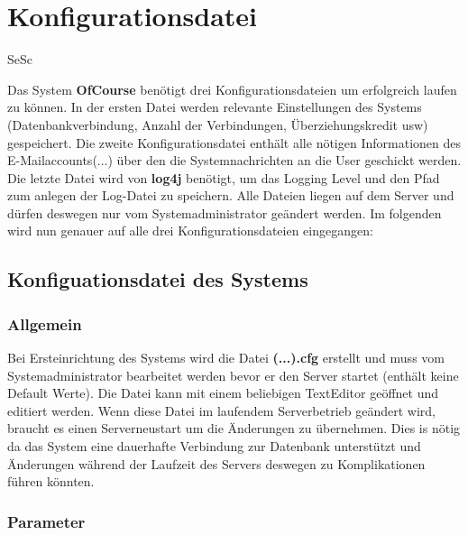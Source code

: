\chapter{Konfigurationsdatei}
\begin{tiny}
	SeSc
\end{tiny}

Das System \textbf{OfCourse} benötigt drei Konfigurationsdateien um erfolgreich laufen zu können. In der ersten Datei werden relevante Einstellungen des Systems (Datenbankverbindung, Anzahl der Verbindungen, Überziehungskredit usw) gespeichert. Die zweite Konfigurationsdatei enthält alle nötigen Informationen des E-Mailaccounts(...) über den die Systemnachrichten an die User geschickt werden. Die letzte Datei wird von \textbf{log4j} benötigt, um das Logging Level und den Pfad zum anlegen der Log-Datei zu speichern. Alle Dateien liegen auf dem Server und dürfen deswegen nur vom Systemadministrator geändert werden. Im folgenden wird nun genauer auf alle drei Konfigurationsdateien eingegangen:

\section{Konfiguationsdatei des Systems}
\subsection{Allgemein}

Bei Ersteinrichtung des Systems wird die Datei \textbf{(...).cfg} erstellt und muss vom Systemadministrator bearbeitet werden bevor er den Server startet (enthält keine Default Werte). Die Datei kann mit einem beliebigen TextEditor geöffnet und editiert werden. Wenn diese Datei im laufendem Serverbetrieb geändert wird, braucht es einen Serverneustart um die Änderungen zu übernehmen. Dies is nötig da das System eine dauerhafte Verbindung zur Datenbank unterstützt und Änderungen während der Laufzeit des Servers deswegen zu Komplikationen führen könnten.


\subsection{Parameter}

